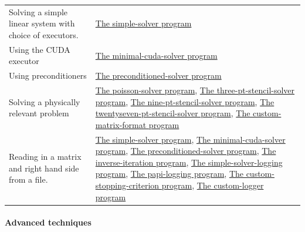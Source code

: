 \tabulinesep=1mm
\begin{longtabu} spread 0pt [c]{*{2}{|X[-1]}|}
\hline
Solving a simple linear system with choice of executors.  &\hyperlink{simple_solver}{The simple-\/solver program}  

\\
Using the C\+U\+DA executor  &\hyperlink{minimal_cuda_solver}{The minimal-\/cuda-\/solver program}  

\\
Using preconditioners  &\hyperlink{preconditioned_solver}{The preconditioned-\/solver program}  

\\
Solving a physically relevant problem  &\hyperlink{poisson_solver}{The poisson-\/solver program}, \hyperlink{three_pt_stencil_solver}{The three-\/pt-\/stencil-\/solver program}, \hyperlink{nine_pt_stencil_solver}{The nine-\/pt-\/stencil-\/solver program}, \hyperlink{twentyseven_pt_stencil_solver}{The twentyseven-\/pt-\/stencil-\/solver program}, \hyperlink{custom_matrix_format}{The custom-\/matrix-\/format program}  

\\
Reading in a matrix and right hand side from a file.  &\hyperlink{simple_solver}{The simple-\/solver program}, \hyperlink{minimal_cuda_solver}{The minimal-\/cuda-\/solver program}, \hyperlink{preconditioned_solver}{The preconditioned-\/solver program}, \hyperlink{inverse_iteration}{The inverse-\/iteration program}, \hyperlink{simple_solver_logging}{The simple-\/solver-\/logging program}, \hyperlink{papi_logging}{The papi-\/logging program}, \hyperlink{custom_stopping_criterion}{The custom-\/stopping-\/criterion program}, \hyperlink{custom_logger}{The custom-\/logger program}  

\\
\end{longtabu}


\paragraph*{{\bfseries Advanced techniques}}

